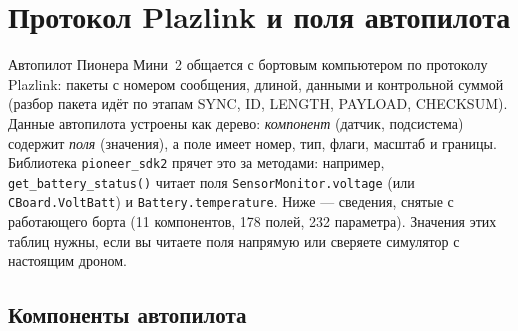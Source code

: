 \section{Протокол Plazlink и поля автопилота}
\label{sec:plazlink-protocol}

Автопилот Пионера Мини~2 общается с бортовым компьютером по протоколу Plazlink: пакеты с номером сообщения, длиной, данными и контрольной суммой (разбор пакета идёт по этапам SYNC, ID, LENGTH, PAYLOAD, CHECKSUM). Данные автопилота устроены как дерево: \emph{компонент} (датчик, подсистема) содержит \emph{поля} (значения), а поле имеет номер, тип, флаги, масштаб и границы. Библиотека \texttt{pioneer\_sdk2} прячет это за методами: например, \verb|get_battery_status()| читает поля \texttt{SensorMonitor.voltage} (или \texttt{CBoard.VoltBatt}) и \texttt{Battery.temperature}. Ниже --- сведения, снятые с работающего борта (11 компонентов, 178 полей, 232 параметра). Значения этих таблиц нужны, если вы читаете поля напрямую или сверяете симулятор с настоящим дроном.

\subsection*{Компоненты автопилота}

